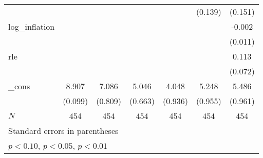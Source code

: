 {\begin{tabular}{l*{6}{c}}
            &                     &                     &                     &                     &     (0.139)         &     (0.151)         \\
\addlinespace
log\_inflation&                     &                     &                     &                     &                     &      -0.002         \\
            &                     &                     &                     &                     &                     &     (0.011)         \\
\addlinespace
rle         &                     &                     &                     &                     &                     &       0.113         \\
            &                     &                     &                     &                     &                     &     (0.072)         \\
\addlinespace
\_cons      &       8.907\sym{***}&       7.086\sym{***}&       5.046\sym{***}&       4.048\sym{***}&       5.248\sym{***}&       5.486\sym{***}\\
            &     (0.099)         &     (0.809)         &     (0.663)         &     (0.936)         &     (0.955)         &     (0.961)         \\
\midrule
\(N\)       &         454         &         454         &         454         &         454         &         454         &         454         \\
\bottomrule
\multicolumn{7}{l}{\footnotesize Standard errors in parentheses}\\
\multicolumn{7}{l}{\footnotesize \sym{*} \(p<0.10\), \sym{**} \(p<0.05\), \sym{***} \(p<0.01\)}\\
\end{tabular}
}
